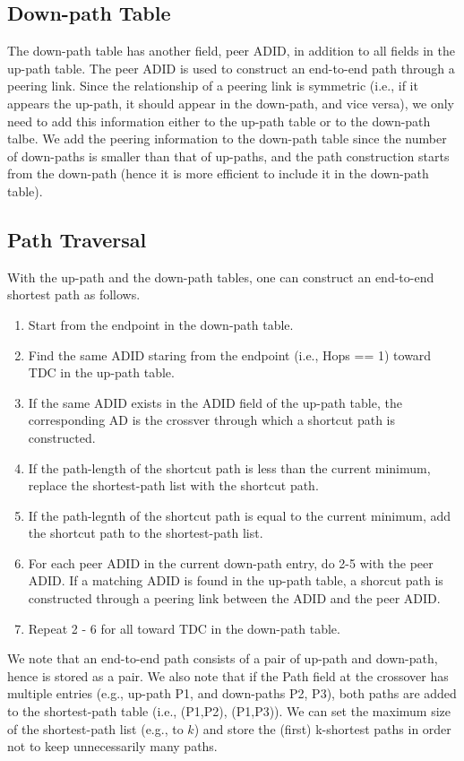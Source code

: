 \subsection{Down-path Table}
The down-path table has another field, peer ADID, in addition to all fields in the up-path table. The peer ADID is used to construct an end-to-end path through a peering link. Since the relationship of a peering link is symmetric (i.e., if it appears the up-path, it should appear in the down-path, and vice versa), we only need to add this information either to the up-path table or to the down-path talbe. We add the peering information to the down-path table since the number of down-paths is smaller than that of up-paths, and the path construction starts from the down-path (hence it is more efficient to include it in the down-path table).

\subsection{Path Traversal}
With the up-path and the down-path tables, one can construct an end-to-end shortest path as follows.
\begin{enumerate}
\item Start from the endpoint \AD in the down-path table.
\item Find the same ADID staring from the endpoint (i.e., Hops == 1) \AD toward TDC \AD in the up-path table.
\item If the same ADID exists in the ADID field of the up-path table, the corresponding AD is the crossver \AD through which a shortcut path is constructed.
\item If the path-length of the shortcut path is less than the current minimum, replace the shortest-path list with the shortcut path.
\item If the path-legnth of the shortcut path is equal to the current minimum, add the shortcut path to the shortest-path list.
\item For each peer ADID in the current down-path entry, do 2-5 with the peer ADID. If a matching ADID is found in the up-path table, a shorcut path is constructed through a peering link between the ADID and the peer ADID.
\item Repeat 2 - 6 for all \ADs toward TDC \AD in the down-path table. 
\end{enumerate}

We note that an end-to-end path consists of a pair of up-path and down-path, hence is stored as a pair. We also note that if the Path field at the crossover \AD has multiple entries (e.g., up-path P1, and down-paths P2, P3), both paths are added to the shortest-path table (i.e., (P1,P2), (P1,P3)). We can set the maximum size of the shortest-path list (e.g., to $k$) and store the (first) k-shortest paths in order not to keep unnecessarily many paths.


